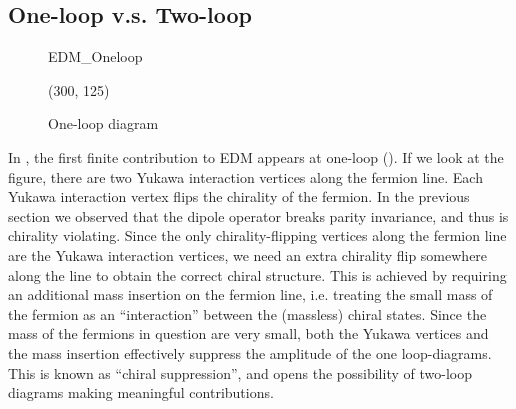 \subsection{One-loop v.s. Two-loop}
\begin{figure}[p]
	\centering
	\begin{fmffile}{EDM_Oneloop}
		\begin{fmfgraph*}(300, 125)
			\fmffreeze
		\end{fmfgraph*}
	\end{fmffile}
	\caption{One-loop diagram}
	\label{fig:oneloop}
\end{figure}
In {\gthdm}, the first finite contribution to EDM appears at one-loop ().
If we look at the figure, there are two Yukawa interaction vertices along the fermion line.
Each Yukawa interaction vertex flips the chirality of the fermion.
In the previous section we observed that the dipole operator breaks parity invariance, and thus is chirality violating.
Since the only chirality-flipping vertices along the fermion line are the Yukawa interaction vertices,
we need an extra chirality flip somewhere along the line to obtain the correct chiral structure.
This is achieved by requiring an additional mass insertion on the fermion line, i.e. treating the small mass of the fermion as an ``interaction'' between the (massless) chiral states.
Since the mass of the fermions in question are very small, both the Yukawa vertices and the mass insertion effectively suppress the amplitude of the one loop-diagrams.
This is known as ``chiral suppression'', and opens the possibility of two-loop diagrams making meaningful contributions.

